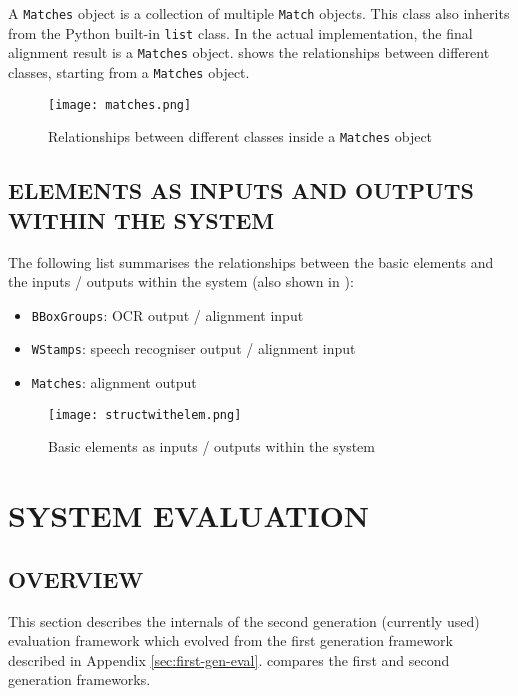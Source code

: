 \documentclass[12pt]{article}
\begin{document}
A \texttt{Matches} object is a collection of multiple \texttt{Match} objects. This class also inherits from the Python built-in \texttt{list} class. In the actual implementation, the final alignment result is a \texttt{Matches} object.  shows the relationships between different classes, starting from a \texttt{Matches} object.

\begin{figure}[t]
    \centering
    \texttt{[image: matches.png]}
    \caption{Relationships between different classes inside a \texttt{Matches} object}
    \label{fig:matches}
\end{figure}

\subsection{ELEMENTS AS INPUTS AND OUTPUTS WITHIN THE SYSTEM}

The following list summarises the relationships between the basic elements and the inputs / outputs within the system (also shown in ):
\begin{itemize}
    \setlength{\itemsep}{0.05em}
    \item \texttt{BBoxGroups}: OCR output / alignment input
    \item \texttt{WStamps}: speech recogniser output / alignment input
    \item \texttt{Matches}: alignment output
\end{itemize}

\begin{figure}[ht]
    \centering
    \texttt{[image: structwithelem.png]}
    \caption{Basic elements as inputs / outputs within the system}
    \label{fig:struct-elem}
\end{figure}


\section{SYSTEM EVALUATION}
\label{sec:system-eval}

\subsection{OVERVIEW}

This section describes the internals of the second generation (currently used) evaluation framework which evolved from the first generation framework described in Appendix \ref{sec:first-gen-eval}.  compares the first and second generation frameworks.
\end{document}
